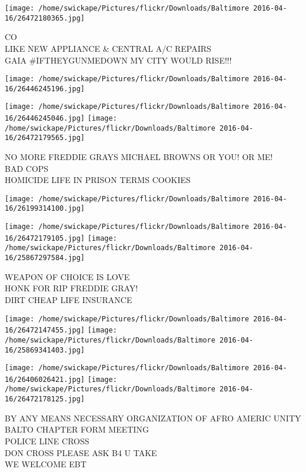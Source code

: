 \documentclass[10pt,letterpaper]{article}
\begin{document}
\vspace{0.25in}
\texttt{[image: /home/swickape/Pictures/flickr/Downloads/Baltimore 2016-04-16/26472180365.jpg]}

CO\\
LIKE NEW APPLIANCE \& CENTRAL A/C REPAIRS\\
GAIA \#IFTHEYGUNMEDOWN MY CITY WOULD RISE!!!
\pagebreak

\texttt{[image: /home/swickape/Pictures/flickr/Downloads/Baltimore 2016-04-16/26446245196.jpg]}

\vspace{0.25in}
\texttt{[image: /home/swickape/Pictures/flickr/Downloads/Baltimore 2016-04-16/26446245046.jpg]}
\texttt{[image: /home/swickape/Pictures/flickr/Downloads/Baltimore 2016-04-16/26472179565.jpg]}

NO MORE FREDDIE GRAYS MICHAEL BROWNS OR YOU!  OR ME!\\
BAD COPS\\
HOMICIDE LIFE IN PRISON TERMS COOKIES
\pagebreak

\texttt{[image: /home/swickape/Pictures/flickr/Downloads/Baltimore 2016-04-16/26199314100.jpg]}

\vspace{0.25in}
\texttt{[image: /home/swickape/Pictures/flickr/Downloads/Baltimore 2016-04-16/26472179105.jpg]}
\texttt{[image: /home/swickape/Pictures/flickr/Downloads/Baltimore 2016-04-16/25867297584.jpg]}

WEAPON OF CHOICE IS LOVE\\
HONK FOR RIP FREDDIE GRAY!\\
DIRT CHEAP LIFE INSURANCE
\pagebreak

\texttt{[image: /home/swickape/Pictures/flickr/Downloads/Baltimore 2016-04-16/26472147455.jpg]}
\texttt{[image: /home/swickape/Pictures/flickr/Downloads/Baltimore 2016-04-16/25869341403.jpg]}

\texttt{[image: /home/swickape/Pictures/flickr/Downloads/Baltimore 2016-04-16/26406026421.jpg]}
\texttt{[image: /home/swickape/Pictures/flickr/Downloads/Baltimore 2016-04-16/26472178125.jpg]}

BY ANY MEANS NECESSARY ORGANIZATION OF AFRO AMERIC UNITY BALTO CHAPTER FORM MEETING\\
POLICE LINE CROSS\\
DON CROSS PLEASE ASK B4 U TAKE\\
WE WELCOME EBT
\pagebreak
\end{document}
